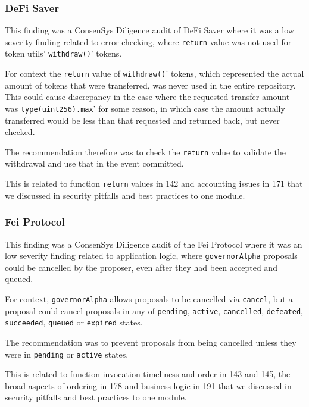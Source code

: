 \subsubsection{DeFi Saver}\label{defi-saver}

This finding was a ConsenSys Diligence audit of DeFi Saver where it was
a low severity finding related to error checking, where \texttt{return}
value was not used for token utils' \texttt{withdraw()}' tokens.

For context the \texttt{return} value of \texttt{withdraw()}' tokens,
which represented the actual amount of tokens that were transferred, was
never used in the entire repository. This could cause discrepancy in the
case where the requested transfer amount was \texttt{type(uint256).max}'
for some reason, in which case the amount actually transferred would be
less than that requested and returned back, but never checked.

The recommendation therefore was to check the \texttt{return} value to
validate the withdrawal and use that in the event committed.

This is related to function \texttt{return} values in 142 and accounting
issues in 171 that we discussed in security pitfalls and best practices
to one module.

\subsubsection{Fei Protocol}\label{fei-protocol}

This finding was a ConsenSys Diligence audit of the Fei Protocol where
it was an low severity finding related to application logic, where
\texttt{governorAlpha} proposals could be cancelled by the proposer,
even after they had been accepted and queued.

For context, \texttt{governorAlpha} allows proposals to be cancelled via
\texttt{cancel}, but a proposal could cancel proposals in any of
\texttt{pending}, \texttt{active}, \texttt{cancelled},
\texttt{defeated}, \texttt{succeeded}, \texttt{queued} or
\texttt{expired} states.

The recommendation was to prevent proposals from being cancelled unless
they were in \texttt{pending} or \texttt{active} states.

This is related to function invocation timeliness and order in 143 and
145, the broad aspects of ordering in 178 and business logic in 191 that
we discussed in security pitfalls and best practices to one module.

